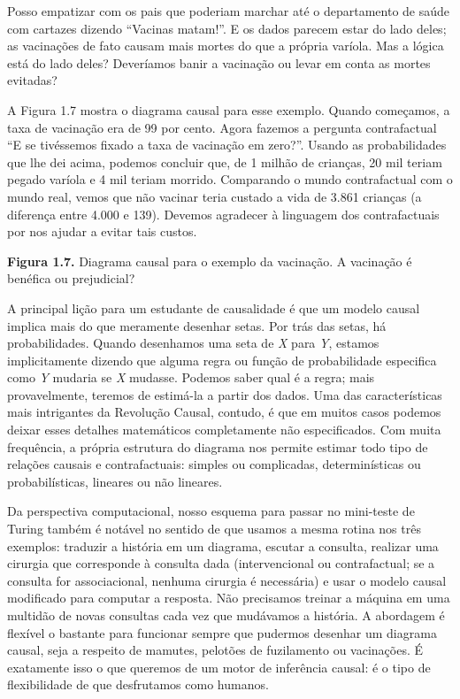\documentclass[11pt,a5paper,twoside]{book}
\begin{document}
Posso empatizar com os pais que poderiam marchar até o departamento de saúde com cartazes dizendo “Vacinas matam!”. E os dados parecem estar do lado deles; as vacinações de fato causam mais mortes do que a própria varíola. Mas a lógica está do lado deles? Deveríamos banir a vacinação ou levar em conta as mortes evitadas?

A Figura 1.7 mostra o diagrama causal para esse exemplo. Quando começamos, a taxa de vacinação era de 99 por cento. Agora fazemos a pergunta contrafactual “E se tivéssemos fixado a taxa de vacinação em zero?”. Usando as probabilidades que lhe dei acima, podemos concluir que, de 1 milhão de crianças, 20 mil teriam pegado varíola e 4 mil teriam morrido. Comparando o mundo contrafactual com o mundo real, vemos que não vacinar teria custado a vida de 3.861 crianças (a diferença entre 4.000 e 139). Devemos agradecer à linguagem dos contrafactuais por nos ajudar a evitar tais custos.

\textbf{Figura 1.7.} Diagrama causal para o exemplo da vacinação. A vacinação é benéfica ou prejudicial?

A principal lição para um estudante de causalidade é que um modelo causal implica mais do que meramente desenhar setas. Por trás das setas, há probabilidades. Quando desenhamos uma seta de \textit{X} para \textit{Y}, estamos implicitamente dizendo que alguma regra ou função de probabilidade especifica como \textit{Y} mudaria se \textit{X} mudasse. Podemos saber qual é a regra; mais provavelmente, teremos de estimá-la a partir dos dados. Uma das características mais intrigantes da Revolução Causal, contudo, é que em muitos casos podemos deixar esses detalhes matemáticos completamente não especificados. Com muita frequência, a própria estrutura do diagrama nos permite estimar todo tipo de relações causais e contrafactuais: simples ou complicadas, determinísticas ou probabilísticas, lineares ou não lineares.

Da perspectiva computacional, nosso esquema para passar no mini-teste de Turing também é notável no sentido de que usamos a mesma rotina nos três exemplos: traduzir a história em um diagrama, escutar a consulta, realizar uma cirurgia que corresponde à consulta dada (intervencional ou contrafactual; se a consulta for associacional, nenhuma cirurgia é necessária) e usar o modelo causal modificado para computar a resposta. Não precisamos treinar a máquina em uma multidão de novas consultas cada vez que mudávamos a história. A abordagem é flexível o bastante para funcionar sempre que pudermos desenhar um diagrama causal, seja a respeito de mamutes, pelotões de fuzilamento ou vacinações. É exatamente isso o que queremos de um motor de inferência causal: é o tipo de flexibilidade de que desfrutamos como humanos.
\end{document}
